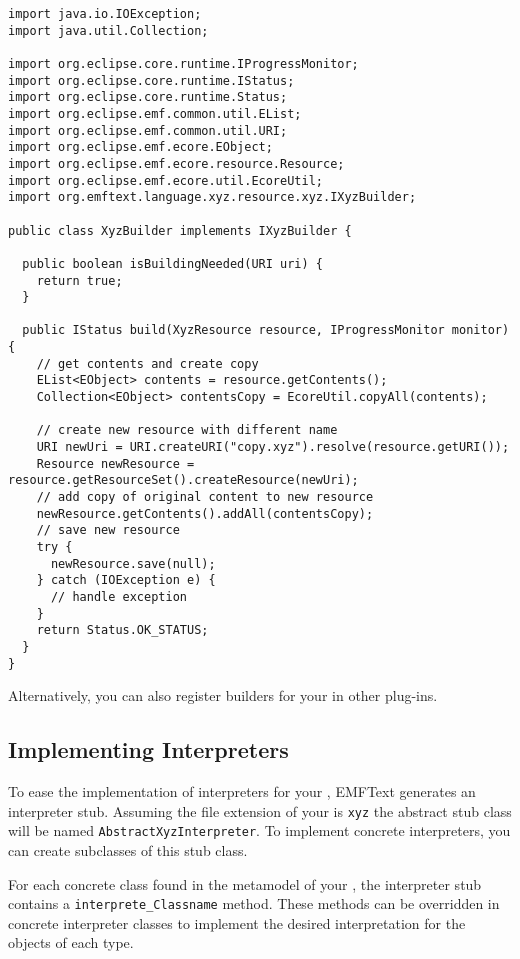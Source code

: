\begin{lstlisting}
import java.io.IOException;
import java.util.Collection;

import org.eclipse.core.runtime.IProgressMonitor;
import org.eclipse.core.runtime.IStatus;
import org.eclipse.core.runtime.Status;
import org.eclipse.emf.common.util.EList;
import org.eclipse.emf.common.util.URI;
import org.eclipse.emf.ecore.EObject;
import org.eclipse.emf.ecore.resource.Resource;
import org.eclipse.emf.ecore.util.EcoreUtil;
import org.emftext.language.xyz.resource.xyz.IXyzBuilder;

public class XyzBuilder implements IXyzBuilder {
  
  public boolean isBuildingNeeded(URI uri) {
    return true;
  }
  
  public IStatus build(XyzResource resource, IProgressMonitor monitor) {
    // get contents and create copy 
    EList<EObject> contents = resource.getContents();
    Collection<EObject> contentsCopy = EcoreUtil.copyAll(contents);
    
    // create new resource with different name
    URI newUri = URI.createURI("copy.xyz").resolve(resource.getURI());
    Resource newResource = resource.getResourceSet().createResource(newUri);
    // add copy of original content to new resource
    newResource.getContents().addAll(contentsCopy);
    // save new resource
    try {
      newResource.save(null);
    } catch (IOException e) {
      // handle exception
    }
    return Status.OK_STATUS;
  }
}
\end{lstlisting}

Alternatively, you can also register builders for your \DSL in other plug-ins.

\subsection{Implementing Interpreters}

To ease the implementation of interpreters for your \DSL, EMFText generates an
interpreter stub. Assuming the file extension of your \DSL is \texttt{xyz} the
abstract stub class will be named \texttt{AbstractXyzInterpreter}. To implement
concrete interpreters, you can create subclasses of this stub class.

For each concrete class found in the metamodel of your \DSL, the interpreter
stub contains a \texttt{interprete\_Classname} method. These methods can be
overridden in concrete interpreter classes to implement the desired interpretation for the
objects of each type.

